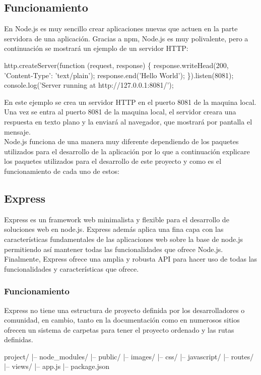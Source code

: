 \subsection{Funcionamiento}
En Node.js es muy sencillo crear aplicaciones nuevas que actuen en la parte servidora de una aplicación. Gracias a npm, Node.js es muy polivalente, pero a continuación se mostrará un ejemplo de un servidor HTTP:

\begin{codigo}
http.createServer(function (request, response) \{
	response.writeHead(200, {'Content-Type': 'text/plain'});
	response.end('Hello World');
\}).listen(8081);
console.log('Server running at http://127.0.0.1:8081/');
\end{codigo}

En este ejemplo se crea un servidor HTTP en el puerto 8081 de la maquina local. Una vez se entra al puerto 8081 de la maquina local, el servidor creara una respuesta en texto plano y la enviará al navegador, que mostrará por pantalla el mensaje.\\

Node.js funciona de una manera muy diferente dependiendo de los paquetes utilizados para el desarrollo de la aplicación por lo que a continuación explicare los paquetes utilizados para el desarrollo de este proyecto y como es el funcionamiento de cada uno de estos:

\subsection{Express}
Express es un framework web minimalista y flexible para el desarrollo de soluciones web en node.js. Express además aplica una fina capa con las características fundamentales de las aplicaciones web sobre la base de node.js permitiendo así mantener todas las funcionalidades que ofrece Node.js. Finalmente, Express ofrece una amplia y robusta API para hacer uso de todas las funcionalidades y características que ofrece.

\subsubsection{Funcionamiento}
Express no tiene una estructura de proyecto definida por los desarrolladores o comunidad, en cambio, tanto en la documentación como en numerosos sitios ofrecen un sistema de carpetas para tener el proyecto ordenado y las rutas definidas.

\begin{codigo}
	project/
	|--	node\_modules/
	|--	public/
			 |--	images/
			 |--	css/
			 |--	javascript/
	|--	routes/
	|--	views/
	|--	app.js
	|--	package.json
\end{codigo}

